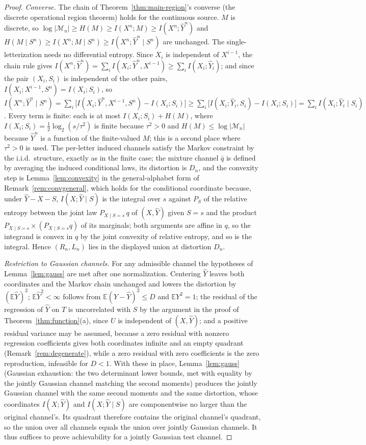 \documentclass[11pt,onecolumn]{IEEEtran}
\newcommand{\E}{\mathbb{E}}
\newcommand{\hY}{\widehat{Y}}
\begin{document}
\begin{proof}
\emph{Converse.} The chain of Theorem~\ref{thm:main-region}'s converse
(the discrete operational region theorem) holds for the continuous
source.
$M$ is discrete, so $\log|\mathcal M_n|\ge H(M)\ge I(X^n;M)\ge
I(X^n;\hY^n)$ and $H(M\mid S^n)\ge I(X^n;M\mid S^n)\ge
I(X^n;\hY^n\mid S^n)$ are unchanged. The single-letterization needs no
differential entropy. Since $X_i$ is independent of $X^{i-1}$, the chain
rule gives
$I(X^n;\hY^n)=\sum_iI(X_i;\hY^n,X^{i-1})\ge\sum_iI(X_i;\hY_i)$; and since
the pair $(X_i,S_i)$ is independent of the other pairs,
$I(X_i;X^{i-1},S^n)=I(X_i;S_i)$, so
$I(X^n;\hY^n\mid S^n)=\sum_i\bigl[I(X_i;\hY^n,X^{i-1},S^n)-I(X_i;S_i)\bigr]
\ge\sum_i\bigl[I(X_i;\hY_i,S_i)-I(X_i;S_i)\bigr]=\sum_iI(X_i;\hY_i\mid S_i)$.
Every term is finite: each is at most $I(X_i;S_i)+H(M)$, where
$I(X_i;S_i)=\tfrac12\log_2(s/\tau^2)$ is finite because $\tau^2>0$ and
$H(M)\le\log|\mathcal M_n|$ because $\hY^n$ is a function of the
finite-valued $M$; this is a second place where $\tau^2>0$ is used. The per-letter induced channels satisfy the
Markov constraint by the i.i.d.\ structure, exactly as in the finite
case; the mixture channel $\bar q$ is defined by averaging the induced
conditional laws, its distortion is $D_n$, and the convexity step is
Lemma~\ref{lem:convexity} in the general-alphabet form of
Remark~\ref{rem:convgeneral}, which holds for the conditional coordinate
because, under $\hY-X-S$, $I(X;\hY\mid S)$ is the integral over $s$
against $P_S$ of the relative entropy between the joint law
$P_{X\mid S=s}\,q$ of $(X,\hY)$ given $S=s$ and the product
$P_{X\mid S=s}\times(P_{X\mid S=s}q)$ of its marginals; both arguments
are affine in $q$, so the integrand is convex in $q$ by the joint
convexity of relative entropy, and so is the integral. Hence
$(R_n,L_n)$ lies in the displayed union at distortion $D_n$.

\emph{Restriction to Gaussian channels.} For any admissible channel the
hypotheses of Lemma~\ref{lem:gauss} are met after one normalization.
Centering $\hY$ leaves both coordinates and the Markov chain unchanged
and lowers the distortion by $(\E\hY)^2$; $\E\hY^2<\infty$ follows from
$\E(Y-\hY)^2\le D$ and $\E Y^2=1$; the residual of the regression of
$\hY$ on $T$ is uncorrelated with $S$ by the argument in the proof of
Theorem~\ref{thm:function}(a), since $U$ is independent of $(X,\hY)$;
and a positive residual variance may be assumed, because a zero
residual with nonzero regression coefficients gives both coordinates
infinite and an empty quadrant (Remark~\ref{rem:degenerate}), while a
zero residual with zero coefficients is the zero reproduction, infeasible
for $D<1$. With these in place,
Lemma~\ref{lem:gauss} (Gaussian exhaustion: the two determinant lower
bounds, met with equality by the jointly Gaussian channel matching the
second moments) produces the jointly Gaussian channel with the
same second moments and the same distortion, whose coordinates
$I(X;\hY)$ and $I(X;\hY\mid S)$ are componentwise no larger than the
original channel's. Its quadrant therefore
contains the original channel's quadrant, so the union over all
channels equals the union over jointly Gaussian channels. It thus
suffices to prove achievability for a jointly Gaussian test channel.


\end{proof}
\end{document}
